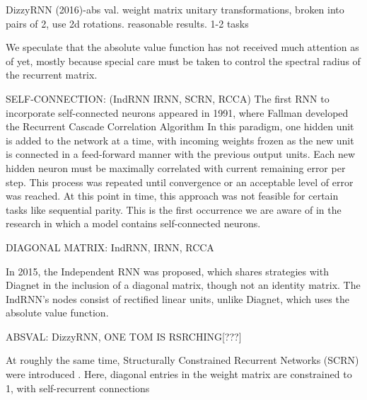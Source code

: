 \documentclass{article}
\begin{document}
DizzyRNN (2016)-abs val. weight matrix unitary transformations, broken into pairs of 2, use 2d rotations. reasonable results. 1-2 tasks

We speculate that the absolute value function has not received much attention as of yet, mostly because special care must be taken to control the spectral radius of the recurrent matrix.





SELF-CONNECTION: (IndRNN IRNN, SCRN, RCCA) 
The first RNN to incorporate self-connected neurons appeared in 1991, where Fallman developed the Recurrent Cascade Correlation Algorithm \citet{Fahlman1990TheRC}  In this paradigm, one hidden unit is added to the network at a time, with incoming weights frozen as the new unit is connected in a feed-forward manner with the previous output units. Each new hidden neuron must be maximally correlated with current remaining error per step.  This process was repeated until convergence or an acceptable level of error was reached.  At this point in time, this approach was not feasible for certain tasks like sequential parity.  This is the first occurrence we are aware of in the research in which a model contains self-connected neurons.  

DIAGONAL MATRIX: IndRNN, IRNN, RCCA

In 2015, the Independent RNN \citet{DBLP:journals/corr/LeJH15} was proposed, which shares strategies with Diagnet in the inclusion of a diagonal matrix, though not an identity matrix. The IndRNN's nodes consist of rectified linear units, unlike Diagnet, which uses the absolute value function.

ABSVAL: DizzyRNN, ONE TOM IS RSRCHING[???]

At roughly the same time, Structurally Constrained Recurrent Networks (SCRN) were introduced \citet{DBLP:journals/corr/MikolovJCMR14}. Here, diagonal entries in the weight matrix are constrained to 1, with self-recurrent connections
\end{document}
